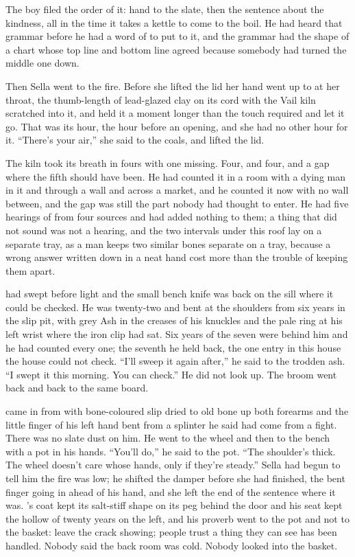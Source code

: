 The boy filed the order of it: hand to the slate, then the sentence about the kindness, all in the time it takes a kettle to come to the boil. He had heard that grammar before he had a word of  to put to it, and the grammar had the shape of a chart whose top line and bottom line agreed because somebody had turned the middle one down.

Then Sella went to the fire. Before she lifted the lid her hand went up to  at her throat, the thumb-length of lead-glazed clay on its cord with the Vail kiln scratched into it, and held it a moment longer than the touch required and let it go. That was its hour, the hour before an opening, and she had no other hour for it. “There's your air,” she said to the coals, and lifted the lid.

The kiln took its breath in fours with one missing. Four, and four, and a gap where the fifth should have been. He had counted it in a room with a dying man in it and through a wall and across a market, and he counted it now with no wall between, and the gap was still the part nobody had thought to enter. He had five hearings of  from four sources and had added nothing to them; a thing that did not sound was not a hearing, and the two intervals under this roof lay on a separate tray, as a man keeps two similar bones separate on a tray, because a wrong answer written down in a neat hand cost more than the trouble of keeping them apart.

 had swept before light and the small bench knife was back on the sill where it could be checked. He was twenty-two and bent at the shoulders from six years in the slip pit, with grey Ash in the creases of his knuckles and the pale ring at his left wrist where the iron clip had sat. Six years of the seven were behind him and he had counted every one; the seventh he held back, the one entry in this house the house could not check. “I'll sweep it again after,” he said to the trodden ash. “I swept it this morning. You can check.” He did not look up. The broom went back and back to the same board.

 came in from  with bone-coloured slip dried to old bone up both forearms and the little finger of his left hand bent from a splinter he said had come from a fight. There was no slate dust on him. He went to the wheel and then to the bench with a pot in his hands. “You'll do,” he said to the pot. “The shoulder's thick. The wheel doesn't care whose hands, only if they're steady.” Sella had begun to tell him the fire was low; he shifted the damper before she had finished, the bent finger going in ahead of his hand, and she left the end of the sentence where it was. 's coat kept its salt-stiff shape on its peg behind the door and his seat kept the hollow of twenty years on the left, and his proverb went to the pot and not to the basket: leave the crack showing; people trust a thing they can see has been handled. Nobody said the back room was cold. Nobody looked into the basket.

